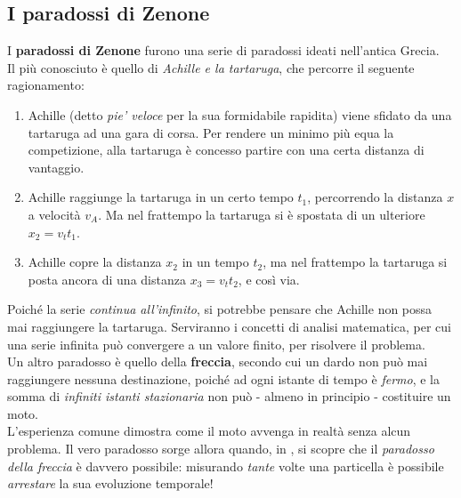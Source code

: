 \documentclass[../../InformazioneQuantistica.tex]{subfiles}
\begin{document}
\subsection{I paradossi di Zenone}
I \textbf{paradossi di Zenone} furono una serie di paradossi ideati nell'antica Grecia.\\
Il più conosciuto è quello di \textit{Achille e la tartaruga}, che percorre il seguente ragionamento:
\begin{enumerate}
\item Achille (detto \textit{pie' veloce} per la sua formidabile rapidita) viene sfidato da una tartaruga ad una gara di corsa. Per rendere un minimo più equa la competizione, alla tartaruga è concesso partire con una certa distanza di vantaggio.
\item Achille raggiunge la tartaruga in un certo tempo $t_1$, percorrendo la distanza $x$ a velocità $v_A$. Ma nel frattempo la tartaruga si è spostata di un ulteriore $x_2 = v_t t_1$.
\item Achille copre la distanza $x_2$ in un tempo $t_2$, ma nel frattempo la tartaruga si posta ancora di una distanza $x_3 = v_t t_2$, e così via. 
\end{enumerate}
Poiché la serie \textit{continua all'infinito}, si potrebbe pensare che Achille non possa mai raggiungere la tartaruga. Serviranno i concetti di analisi matematica, per cui una serie infinita può convergere a un valore finito, per risolvere il problema.\\

Un altro paradosso è quello della \textbf{freccia}, secondo cui un dardo non può mai raggiungere nessuna destinazione, poiché ad ogni istante di tempo è \textit{fermo}, e la somma di \textit{infiniti istanti stazionaria} non può - almeno in principio - costituire un moto.\\

L'esperienza comune dimostra come il moto avvenga in realtà senza alcun problema. Il vero paradosso sorge allora quando, in \MQ, si scopre che il \textit{paradosso della freccia} è davvero possibile: misurando \textit{tante} volte una particella è possibile \textit{arrestare} la sua evoluzione temporale!
\end{document}
